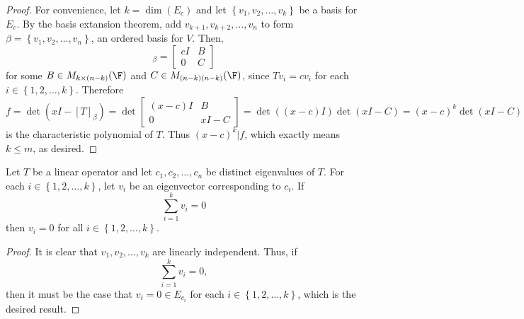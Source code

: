 \documentclass[linearalgebra]{subfiles}
\begin{document}
    \begin{proof}
        For convenience, let $k = \dim \left( E_c \right)$ and let $\left\lbrace v_1, v_2, \ldots, v_k \right\rbrace$ be a basis for $E_c$. By the basis extansion theorem, add $v_{k+1}, v_{k+2}, \ldots, v_n$ to form $\beta = \left\lbrace v_1, v_2, \ldots, v_n \right\rbrace$, an ordered basis for $V$. Then,
        \begin{equation*}
            [T]_\beta =
            \begin{bmatrix}
                cI & B \\ 0 & C
            \end{bmatrix}
        \end{equation*}
        for some $B\in M_{k\times (n-k)}(\F)$ and $C\in M_{(n-k)(n-k)}(\F)$, since $Tv_i = c v_i$ for each $i\in \left\lbrace 1, 2, \ldots, k \right\rbrace$. Therefore
        \begin{equation*}
            f = \det \left( xI-\left[ T \right] _\beta \right) = \det \begin{bmatrix} (x-c)I & B \\ 0 & xI-C \end{bmatrix} = \det \left( (x-c)I \right)\det \left( xI-C \right) = (x-c)^k \det \left( xI-C \right)
        \end{equation*}
        is the characteristic polynomial of $T$. Thus $(x-c)^k|f$, which exactly means $k\leq m$, as desired.
    \end{proof}

    \begin{prop}{}
        Let $T$ be a linear operator and let $c_1, c_2, \ldots, c_n$ be distinct eigenvalues of $T$. For each $i\in \left\lbrace 1, 2, \ldots, k \right\rbrace$, let $v_i$ be an eigenvector corresponding to $c_i$. If
        \begin{equation*}
            \sum^k_{i=1} v_i = 0
        \end{equation*}
        then $v_i=0$ for all $i\in \left\lbrace 1, 2, \ldots, k \right\rbrace$.
    \end{prop}

    \begin{proof}
        It is clear that $v_1, v_2, \ldots, v_k$ are linearly independent. Thus, if
        \begin{equation*}
            \sum^k_{i=1}v_i = 0,
        \end{equation*}
        then it must be the case that $v_i = 0\in E_{c_i}$ for each $i\in \left\lbrace 1, 2, \ldots, k \right\rbrace$, which is the desired result.
    \end{proof}
\end{document}
